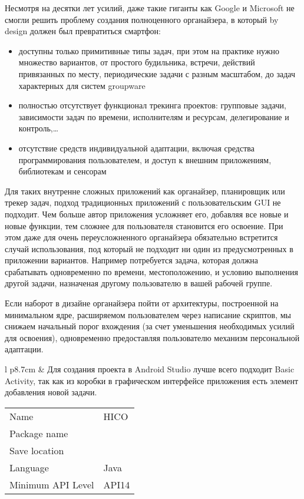 \noindent
Несмотря на десятки лет усилий, даже такие гиганты как Google и Microsoft не
смогли решить проблему создания полноценного органайзера, в который by design
должен был превратиться смартфон:
\begin{itemize}
  \item доступны только примитивные типы задач, при этом на практике нужно
  множество вариантов, от простого будильника, встречи, действий привязанных по
  месту, периодические задачи с разным масштабом, до задач характерных для систем
  groupware
  \item полностью отсутствует функционал трекинга проектов: групповые
  задачи, зависимости задач по времени, исполнителям и ресурсам, делегирование и
  контроль,\ldots
  \item отсутствие средств индивидуальной адаптации, включая средства
  программирования пользователем, и доступ к внешним приложениям, библиотекам и
  сенсорам
\end{itemize}

\noindent
Для таких внутренне сложных приложений как органайзер, планировщик или трекер
задач, подход традиционных приложений с пользовательским GUI не подходит. Чем
больше автор приложения усложняет его, добавляя все новые и новые функции, тем
сложнее для пользователя становится его освоение. При этом даже для
очень переусложненного органайзера обязательно встретится случай использования,
под который не подходит ни один из предусмотренных в приложении вариантов.
Например потребуется задача, которая должна срабатывать одновременно по времени,
местоположению, и условию выполнения другой задачи, назначеная другому
пользователю в вашей рабочей группе.

Если наборот в дизайне органайзера пойти от архитектуры, построенной на
минимальном ядре, расширяемом пользователем через написание скриптов, мы снижаем
начальный порог вхождения (за счет уменьшения необходимых усилий для освоения),
одновременно предоставляя пользователю механизм персональной адаптации.

\medskip\noindent
\begin{tabular}{l p{8.7cm}}
 &
Для создания проекта в Android Studio лучше всего подходит Basic Activity, так
как из коробки в графическом интерфейсе приложения есть элемент добавления новой
задачи.

\medskip
\begin{tabular}{l l}
Name & HICO \\
Package name & \file{io.github.ponyatov.hico} \\
Save location & \file{/home/ponyatov/hico/Android} \\
Language & Java \\
Minimum API Level & API14\\
\end{tabular}
\\
\end{tabular}

